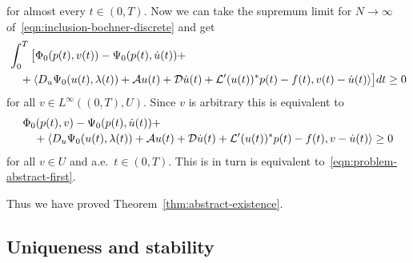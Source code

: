 \documentclass[a4paper,10pt,twoside]{amsbook}
\numberwithin{section}{chapter}
\numberwithin{equation}{chapter}
\theoremstyle{definition}
\DeclarePairedDelimiter{\dual}{\langle}{\rangle}
\begin{document}
for almost every $t\in(0,T)$. Now we can take the supremum limit for $N\to\infty$ of~\eqref{eqn:inclusion-bochner-discrete} and get
\begin{equation}
\label{eqn:inclusion-bochner}
\begin{multlined}
\int_0^T\big[\Phi_0(p(t),v(t))-\Psi_0(p(t),\dot u(t))+\\
+\dual{D_u\Psi_0(u(t),\lambda(t))+\mathcal{A}u(t)+\mathcal{D}\dot u(t)+\mathcal{L}'(u(t))^*p(t)-f(t),v(t)-\dot u(t)}\big]dt\ge0
\end{multlined}
\end{equation}
for all $v\in L^\infty((0,T),U)$. Since $v$ is arbitrary this is equivalent to
\begin{equation}
\label{eqn:explicit-inclusion}
\begin{multlined}
\Phi_0(p(t),v)-\Psi_0(p(t),\dot u(t))+\\
+\dual{D_u\Psi_0(u(t),\lambda(t))+\mathcal{A}u(t)+\mathcal{D}\dot u(t)+\mathcal{L}'(u(t))^*p(t)-f(t),v-\dot u(t)}\ge0
\end{multlined}
\end{equation}
for all $v\in U$ and a.e.\ $t\in(0,T)$. This is in turn is equivalent to~\eqref{eqn:problem-abstract-first}.

Thus we have proved Theorem~\ref{thm:abstract-existence}.

\subsection{Uniqueness and stability}
\end{document}
